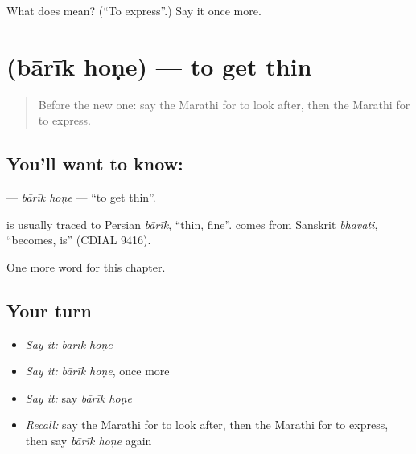 \begin{tcolorbox}[breakable,colback=teal!4,colframe=teal!35!black,title={Before you move on}]
What does   mean? (\textquotedblleft{}To express\textquotedblright{}.) Say it once more.
\end{tcolorbox}
\section[\texorpdfstring{\mr{बारीक} \mr{होणे} (bārīk hoṇe)}{बारीक होणे (bārīk hoṇe)}]{  (bārīk hoṇe) — to get thin}

\label{lesson:MR-C256-barik-hone}



\begin{quote}
Before the new one: say the Marathi for to look after, then the Marathi for to express.
\end{quote}

\subsection*{You'll want to know:  }
\textbf{ } — \emph{bārīk hoṇe} — \textquotedblleft{}to get thin\textquotedblright{}.

\begin{cousinweb}
\textbf{} is usually traced to Persian \emph{bārīk}, \textquotedblleft{}thin, fine\textquotedblright{}. \textbf{} comes from Sanskrit \emph{bhavati}, \textquotedblleft{}becomes, is\textquotedblright{} (CDIAL 9416).
\end{cousinweb}

\begin{grammarlens}[title={What you've built}]
One more word for this chapter.
\end{grammarlens}

\subsection*{Your turn}
\begin{itemize}
\raggedright
  \item \emph{Say it:} \emph{bārīk hoṇe}
  \item \emph{Say it:} \emph{bārīk hoṇe}, once more
  \item \emph{Say it:} say \emph{bārīk hoṇe}
  \item \emph{Recall:} say the Marathi for to look after, then the Marathi for to express, then say \emph{bārīk hoṇe} again
\end{itemize}

